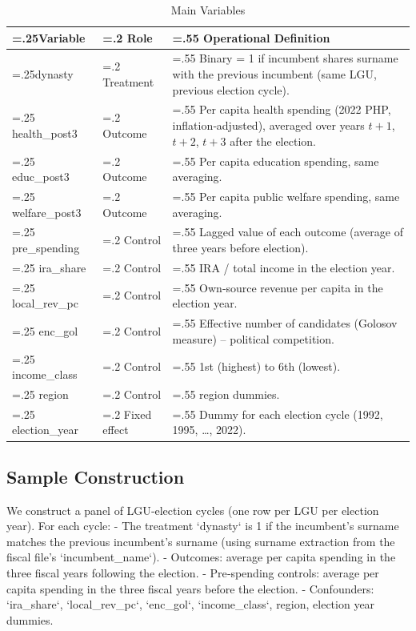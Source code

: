 \documentclass[conference]{IEEEtran}
\begin{document}
\begin{table}[hbt!]
\caption{Main Variables}
\label{tab:main_vars}
\centering
\begin{tabularx}{\columnwidth}{>{\hsize=.25\hsize}X >{\hsize=.2\hsize}X >{\hsize=.55\hsize}X}
\toprule
\textbf{Variable} & \textbf{Role} & \textbf{Operational Definition} \\
\midrule
dynasty & Treatment & Binary = 1 if incumbent shares surname with the previous incumbent (same LGU, previous election cycle). \\ \addlinespace
health\_post3 & Outcome & Per capita health spending (2022 PHP, inflation‑adjusted), averaged over years $t+1$, $t+2$, $t+3$ after the election. \\ \addlinespace
educ\_post3 & Outcome & Per capita education spending, same averaging. \\ \addlinespace
welfare\_post3 & Outcome & Per capita public welfare spending, same averaging. \\ \addlinespace
pre\_spending & Control & Lagged value of each outcome (average of three years before election). \\ \addlinespace
ira\_share & Control & IRA / total income in the election year. \\ \addlinespace
local\_rev\_pc & Control & Own‑source revenue per capita in the election year. \\ \addlinespace
enc\_gol & Control & Effective number of candidates (Golosov measure) – political competition. \\ \addlinespace
income\_class & Control & 1st (highest) to 6th (lowest). \\ \addlinespace
region & Control & 17 region dummies. \\ \addlinespace
election\_year & Fixed effect & Dummy for each election cycle (1992, 1995, …, 2022). \\
\bottomrule
\end{tabularx}
\end{table}

\subsection{Sample Construction}
We construct a panel of LGU‑election cycles (one row per LGU per election year). For each cycle:
- The treatment `dynasty` is 1 if the incumbent’s surname matches the previous incumbent’s surname (using surname extraction from the fiscal file’s `incumbent_name`).
- Outcomes: average per capita spending in the three fiscal years following the election.
- Pre‑spending controls: average per capita spending in the three fiscal years before the election.
- Confounders: `ira_share`, `local_rev_pc`, `enc_gol`, `income_class`, region, election year dummies.
\end{document}
